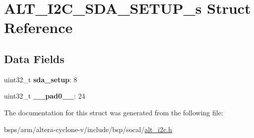 \hypertarget{structALT__I2C__SDA__SETUP__s}{}\section{A\+L\+T\+\_\+\+I2\+C\+\_\+\+S\+D\+A\+\_\+\+S\+E\+T\+U\+P\+\_\+s Struct Reference}
\label{structALT__I2C__SDA__SETUP__s}
\subsection*{Data Fields}
\begin{DoxyCompactItemize}
\item 
\mbox{\label{structALT__I2C__SDA__SETUP__s_a6c8d1f2e03eded435f55cdae316d94bf}} 
uint32\+\_\+t {\bfseries sda\+\_\+setup}\+: 8
\item 
\mbox{\label{structALT__I2C__SDA__SETUP__s_a21612f4b3cd6e5273cb6d30b3f781e5b}} 
uint32\+\_\+t {\bfseries \+\_\+\+\_\+pad0\+\_\+\+\_\+}\+: 24
\end{DoxyCompactItemize}


The documentation for this struct was generated from the following file\+:\begin{DoxyCompactItemize}
\item 
bsps/arm/altera-\/cyclone-\/v/include/bsp/socal/\mbox{\hyperlink{socal_2alt__i2c_8h}{alt\+\_\+i2c.\+h}}\end{DoxyCompactItemize}
